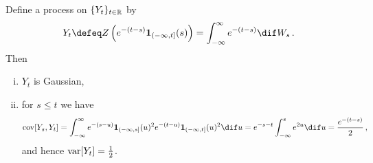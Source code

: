 \documentclass[../../../Master/AppliedStochastics.tex]{subfiles}
\begin{document}
\begin{example}[Energy]
    Define a process on $\{Y_t\}_{t\in\mathbb{R}}$ by
\begin{equation*}
        Y_t \defeq Z\left(e^{-(t-s)} \mathbf{1}_{(-\infty,t]}(s)\right)
            = \int_{-\infty}^\infty e^{-(t-s)} \dif W_s\,.
\end{equation*}
    Then
\begin{enumerate}[(i)]
    \item
    $Y_t$ is Gaussian,
    
    \item
    for $s\leq t$ we have 
    \begin{equation*}
        \cov[Y_s, Y_t] = \int_{-\infty}^\infty
            e^{-(s-u)} \mathbf{1}_{(-\infty,s]}(u)^2
            e^{-(t-u)} \mathbf{1}_{(-\infty,t]}(u)^2  \dif u
        = e^{-s-t} \int_{-\infty}^s e^{2u} \dif u
        = \frac{e^{-(t-s)}}{2}\,,
     \end{equation*}
     and hence $\operatorname{var}[Y_t] = \frac{1}{2}$.
\end{enumerate}
\end{example}




%
\end{document}
